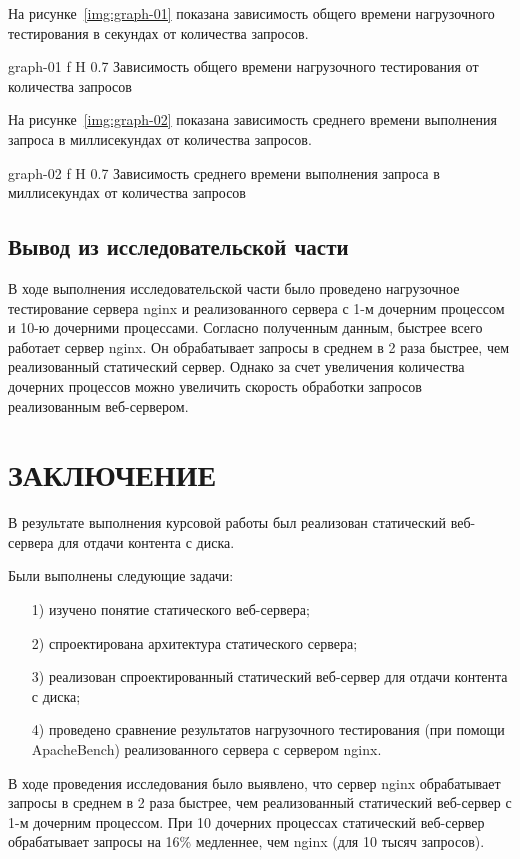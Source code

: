 \documentclass{bmstu}
\begin{document}
\pagebreak
На рисунке~\ref{img:graph-01} показана зависимость общего времени нагрузочного тестирования в секундах от количества запросов.

    {graph-01}
    {f}
    {H}
    {0.7\textwidth}
    {Зависимость общего времени нагрузочного тестирования от количества запросов}
    
На рисунке~\ref{img:graph-02} показана зависимость среднего времени выполнения запроса в миллисекундах от количества запросов.

    {graph-02}
    {f}
    {H}
    {0.7\textwidth}
    {Зависимость среднего времени выполнения запроса в миллисекундах от количества запросов}

\section*{Вывод из исследовательской части}

В ходе выполнения исследовательской части было проведено нагрузочное тестирование сервера nginx и реализованного сервера с 1-м дочерним процессом и 10-ю дочерними процессами. 
Согласно полученным данным, быстрее всего работает сервер nginx. 
Он обрабатывает запросы в среднем в 2 раза быстрее, чем реализованный статический сервер. 
Однако за счет увеличения количества дочерних процессов можно увеличить скорость обработки запросов реализованным веб-сервером.

{\centering \chapter*{ЗАКЛЮЧЕНИЕ}}

В результате выполнения курсовой работы был реализован статический веб-сервера для отдачи контента с диска.

Были выполнены следующие задачи:
\begin{enumerate}
\item[1)] изучено понятие статического веб-сервера;
\item[2)] спроектирована архитектура статического сервера;
\item[3)] реализован спроектированный статический веб-сервер для отдачи контента с диска;
\item[4)] проведено сравнение результатов нагрузочного тестирования (при помощи ApacheBench) реализованного сервера с сервером nginx.
\end{enumerate}

В ходе проведения исследования было выявлено, что сервер nginx обрабатывает запросы в среднем в 2 раза быстрее, чем реализованный статический веб-сервер с 1-м дочерним процессом. 
При 10 дочерних процессах статический веб-сервер обрабатывает запросы на 16\% медленнее, чем nginx (для 10 тысяч запросов).
\end{document}
